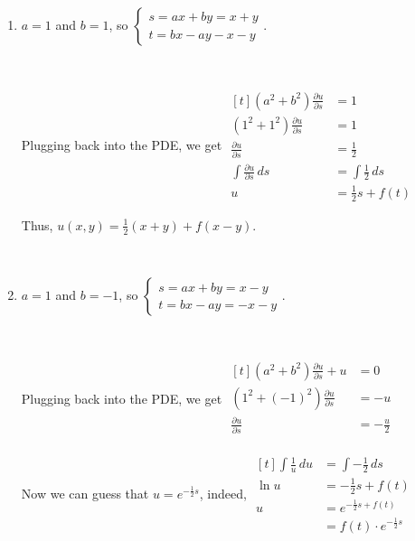 \documentclass[11pt,fleqn]{book} %
\begin{document}
\begin{enumerate}
    {~~~}

    \item $a = 1$ and $b = 1$, so $\begin{cases}
        s = ax + by = x + y \\
        t = bx - ay - x - y
    \end{cases}$. 

    {~~~}

    Plugging back into the PDE, we get $\begin{aligned}[t]
        (a^2 + b^2) \frac{\partial u}{\partial s} & = 1                     \\
        (1^2 + 1^2) \frac{\partial u}{\partial s} & = 1                     \\
        \frac{\partial u}{\partial s}             & = \frac{1}{2}           \\
        \int \frac{\partial u}{\partial s} \,ds   & = \int \frac{1}{2} \,ds \\
        u                                         & = \frac{1}{2} s + f(t)
    \end{aligned}$

    Thus, $u(x, y) = \frac{1}{2}(x + y) + f(x - y)$. 

    {~~~}

    \item $a = 1$ and $b = -1$, so $\begin{cases}
        s = ax + by = x - y \\
        t = bx - ay = -x - y
    \end{cases}$. 

    {~~~}

    Plugging back into the PDE, we get $\begin{aligned}[t]
        (a^2 + b^2) \frac{\partial u}{\partial s} + u & = 0                            \\
        (1^2 + (-1)^2) \frac{\partial u}{\partial s}  & = -u                           \\
        \frac{\partial u}{\partial s}                 & = -\frac{u}{2}                 \\
    \end{aligned}$
    
    Now we can guess that $u=e^{-\frac{1}{2}s}$, indeed, 
    $\begin{aligned}[t]
        \int \frac{1}{u} \,du                         & = \int -\frac{1}{2} \,ds       \\
        \ln u                                         & = -\frac{1}{2}s + f(t)         \\
        u                                             & = e^{-\frac{1}{2}s + f(t)}     \\
                                                      & = f(t) \cdot e^{-\frac{1}{2}s}
    \end{aligned}$


\end{enumerate}
\end{document}
